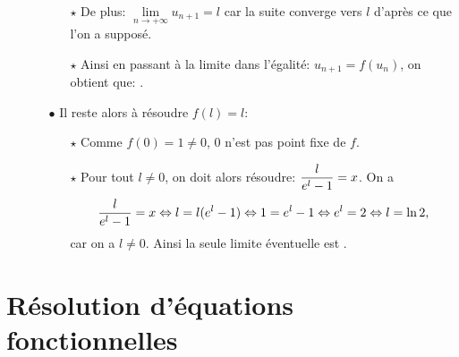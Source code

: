 \documentclass[a4paper, 11pt,reqno]{article}
\begin{document}
\begin{correction}
\begin{enumerate}
\begin{itemize}
\begin{itemize}
				            \item[$\star$] De plus: $\lim\limits_{n\to +\infty} u_{n+1}=l$ car la suite converge vers $l$ d'apr\`{e}s ce que l'on a suppos\'e.
				            \item[$\star$] Ainsi en passant \`{a} la limite dans l'\'egalit\'e: $u_{n+1}=f(u_n)$, on obtient que: .
			            \end{itemize}
			      \item[$\bullet$] Il reste alors \`{a} r\'esoudre $f(l)=l$:
			            \begin{itemize}
				            \item[$\star$] Comme $f(0)=1\not= 0$, 0 n'est pas point fixe de $f$.
				            \item[$\star$] Pour tout $l\not= 0$, on doit alors r\'esoudre: $\displaystyle\frac{l}{e^l-1}=x$. On a
				                  $$\displaystyle\frac{l}{e^l-1}=x\Leftrightarrow l=l(e^l-1) \Leftrightarrow 1=e^l-1 \Leftrightarrow e^l =2 \Leftrightarrow l=\ln 2,$$
				                  car on a $l \not=0$. Ainsi la seule limite \'eventuelle est .
			            \end{itemize}
		      \end{itemize}
	\end{enumerate}
\end{correction}


\vspace{0.5cm}
\noindent\section{\large{R\'esolution d'\'equations fonctionnelles}}
\end{document}
